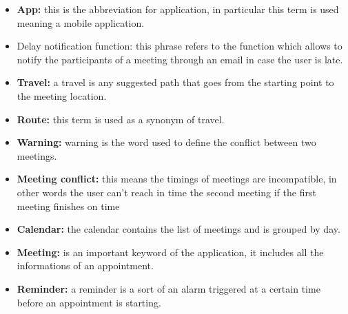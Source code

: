 \begin{itemize}

\item  \textbf{App:} this is the abbreviation for application, in particular this term is used meaning a mobile application.

\item  Delay notification function: this phrase refers to the function which allows to notify the participants of a meeting through an email in case the user is late.

\item  \textbf{Travel:} a travel is any suggested path that goes from the starting point to the meeting location.

\item  \textbf{Route:} this term is used as a synonym of travel.

\item  \textbf{Warning:} warning is the word used to define the conflict between two meetings.

\item \textbf{Meeting conflict:} this means the timings of meetings are incompatible, in other words the user can't reach in time the second meeting if the first meeting finishes on time

\item  \textbf{Calendar:} the calendar contains the list of meetings and is grouped by day.

\item  \textbf{Meeting:} is an important keyword of the application, it includes all the informations of an appointment.

\item  \textbf{Reminder:} a reminder is a sort of an alarm triggered at a certain time before an appointment is starting.


\end{itemize}